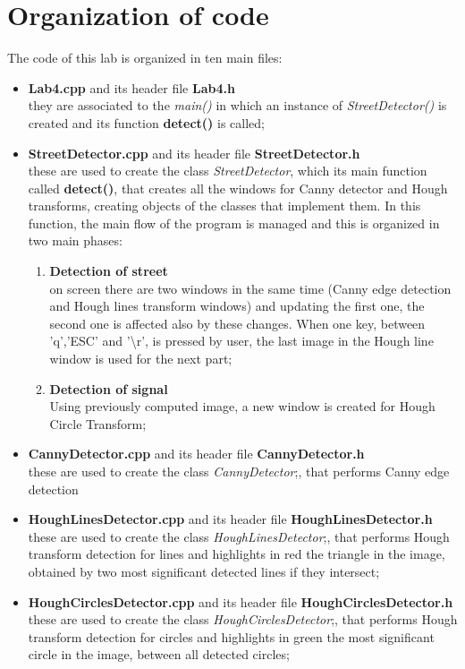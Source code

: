 \documentclass{article}
\begin{document}
\section{Organization of code}
The code of this lab is organized in ten main files:
\begin{itemize}
\item{\textbf{Lab4.cpp} and its header file \textbf{Lab4.h}\\
they are associated to the \textit{main()} in which an instance of \textit{StreetDetector()} is created and its function \textbf{detect()} is called;}
\item{\textbf{StreetDetector.cpp} and its header file \textbf{StreetDetector.h}\\
these are used to create the class \textit{StreetDetector}, which its main function called \textbf{detect()}, that creates all the windows for Canny detector and Hough transforms, creating objects of the classes that implement them. In this function, the main flow of the program is managed and this is organized in two main phases:
\begin{enumerate}
\item{\textbf{Detection of street}\\
on screen there are two windows in the same time (Canny edge detection and Hough lines transform windows) and updating the first one, the second one is affected also by these changes. When one key, between 'q','ESC' and '\textbackslash{r}', is pressed by user, the last image in the Hough line window is used for the next part;
}
\item{\textbf{Detection of signal}\\
Using previously computed image, a new window is created for Hough Circle Transform;
}
\end{enumerate}
}
\item{\textbf{CannyDetector.cpp} and its header file \textbf{CannyDetector.h}\\
these are used to create the class \textit{CannyDetector};, that performs Canny edge detection}
\item{\textbf{HoughLinesDetector.cpp} and its header file \textbf{HoughLinesDetector.h}\\
these are used to create the class \textit{HoughLinesDetector};, that performs Hough transform detection for lines and highlights in red the triangle in the image, obtained by two most significant detected lines if they intersect;}
\item{\textbf{HoughCirclesDetector.cpp} and its header file \textbf{HoughCirclesDetector.h}\\
these are used to create the class \textit{HoughCirclesDetector};, that performs Hough transform detection for circles and highlights in green the most significant circle in the image, between all detected circles;}
\end{itemize}
\end{document}
